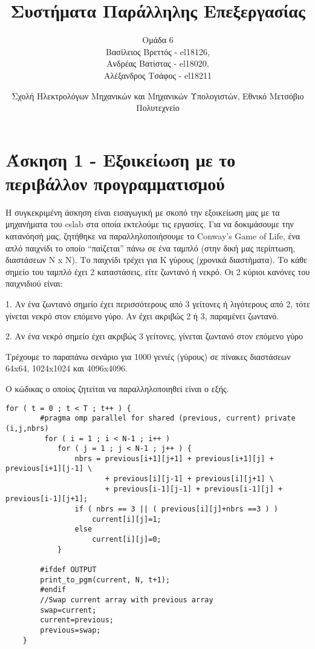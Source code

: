 \documentclass[letterpaper,12pt]{article}
\begin{document}
\graphicspath{{../Lab2/plots/}{../Lab1/plot/}}

\title{Συστήματα Παράλληλης Επεξεργασίας}
\author{Ομάδα 6 \\
Βασίλειος Βρεττός - el18126, \\
Ανδρέας Βατίστας - el18020, \\
Αλέξανδρος Τσάφος - el18211\\}
\date{Σχολή Ηλεκτρολόγων Μηχανικών και Μηχανικών Υπολογιστών, Εθνικό Μετσόβιο Πολυτεχνείο}
\maketitle




\section{Άσκηση 1 - Εξοικείωση με το περιβάλλον προγραμματισμού}
Η συγκεκριμένη άσκηση είναι εισαγωγική με σκοπό την εξοικείωση μας με τα μηχανήματα του cslab στα οποία εκτελούμε τις εργασίες. Για να δοκιμάσουμε την κατανόησή μας, ζητήθηκε να παραλληλοποιήσουμε το Conway’s Game of Life, ένα απλό παιχνίδι το οποίο “παίζεται” πάνω σε ένα ταμπλό (στην δική μας περίπτωση, διαστάσεων N x N). Το παιχνίδι τρέχει για Κ γύρους (χρονικά διαστήματα). Το κάθε σημείο του ταμπλό έχει 2 καταστάσεις, είτε ζωντανό ή νεκρό. Οι 2 κύριοι κανόνες του παιχνιδιού είναι: \newline

1.	Αν ένα ζωντανό σημείο έχει περισσότερους από 3 γείτονες ή λιγότερους από 2, τότε γίνεται νεκρό στον επόμενο γύρο. Αν έχει ακριβώς 2 ή 3, παραμένει ζωντανό. 

2.	Αν ένα νεκρό σημείο έχει ακριβώς 3 γείτονες, γίνεται ζωντανό στον επόμενο γύρο \newline

Τρέχουμε το παραπάνω σενάριο για 1000 γενιές (γύρους) σε πίνακες διαστάσεων 64x64, 1024x1024 και 4096x4096. \newline

Ο κώδικας ο οποίος ζητείται να παραλληλοποιηθεί είναι ο εξής.


\begin{lstlisting}
for ( t = 0 ; t < T ; t++ ) {
        #pragma omp parallel for shared (previous, current) private (i,j,nbrs)
         for ( i = 1 ; i < N-1 ; i++ )
            for ( j = 1 ; j < N-1 ; j++ ) {
                nbrs = previous[i+1][j+1] + previous[i+1][j] + previous[i+1][j-1] \
                       + previous[i][j-1] + previous[i][j+1] \
                       + previous[i-1][j-1] + previous[i-1][j] + previous[i-1][j+1];
                if ( nbrs == 3 || ( previous[i][j]+nbrs ==3 ) )
                    current[i][j]=1;
                else
                    current[i][j]=0;
            }

        #ifdef OUTPUT
        print_to_pgm(current, N, t+1);
        #endif
        //Swap current array with previous array
        swap=current;
        current=previous;
        previous=swap;
    }
\end{lstlisting}
\end{document}
